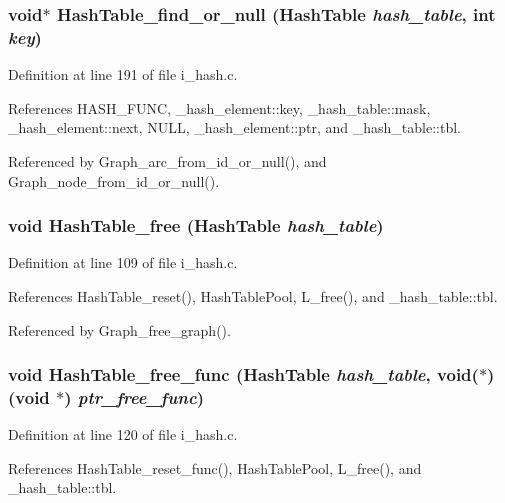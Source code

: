 \subsubsection{\setlength{\rightskip}{0pt plus 5cm}void$\ast$ Hash\-Table\_\-find\_\-or\_\-null (\bf{Hash\-Table} {\em hash\_\-table}, int {\em key})}\label{i__hash_8c_08585a8f2a9e0291220a7fc41739060d}




Definition at line 191 of file i\_\-hash.c.

References HASH\_\-FUNC, \_\-hash\_\-element::key, \_\-hash\_\-table::mask, \_\-hash\_\-element::next, NULL, \_\-hash\_\-element::ptr, and \_\-hash\_\-table::tbl.

Referenced by Graph\_\-arc\_\-from\_\-id\_\-or\_\-null(), and Graph\_\-node\_\-from\_\-id\_\-or\_\-null().
\subsubsection{\setlength{\rightskip}{0pt plus 5cm}void Hash\-Table\_\-free (\bf{Hash\-Table} {\em hash\_\-table})}\label{i__hash_8c_cc9ab22eb7e09aca78cbe0188a4b7122}




Definition at line 109 of file i\_\-hash.c.

References Hash\-Table\_\-reset(), Hash\-Table\-Pool, L\_\-free(), and \_\-hash\_\-table::tbl.

Referenced by Graph\_\-free\_\-graph().
\subsubsection{\setlength{\rightskip}{0pt plus 5cm}void Hash\-Table\_\-free\_\-func (\bf{Hash\-Table} {\em hash\_\-table}, void($\ast$)(void $\ast$) {\em ptr\_\-free\_\-func})}\label{i__hash_8c_6d092f1a97c02895a48a10d19abd7493}




Definition at line 120 of file i\_\-hash.c.

References Hash\-Table\_\-reset\_\-func(), Hash\-Table\-Pool, L\_\-free(), and \_\-hash\_\-table::tbl.
